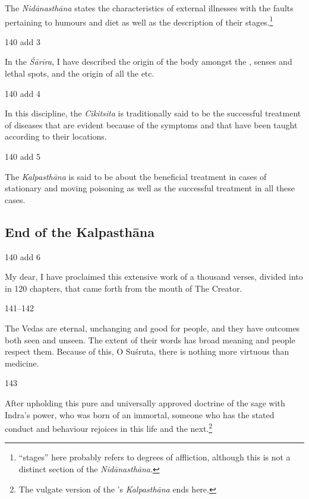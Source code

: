 \begin{translation}
The \emph{Nidānasthāna} states the characteristics of external
illnesses with the faults pertaining to humours and diet as well as
the description of their stages.\footnote{ “stages” here
    probably refers to degrees of affliction, although this is not a
    distinct section of the \emph{Nidānasthāna}.} 
    

\item[140 add 3]

In the \emph{Śārīra}, I have described the origin of the body amongst the 
, senses and lethal spots, and the origin of all the 
 etc. 

\item[140 add 4]

In this discipline, the \emph{Cikitsita} is traditionally said to be the successful 
treatment of diseases that are evident because of the symptoms and that have 
been taught according to their locations.

\item[140 add 5]

The \emph{Kalpasthāna} is said to be about the beneficial treatment in cases of 
stationary and moving poisoning as well as the successful treatment in all these 
cases.


\subsection{End of the Kalpasthāna}

\item[140 add 6]

My dear, I have proclaimed this extensive work of a thousand verses, divided 
into in 120 chapters, that came forth from the mouth of The Creator.

\item[141--142]

The Vedas are eternal, unchanging and good for people, and they have 
outcomes both seen and unseen. The extent of their words has broad meaning 
and people respect them.  Because of this, O Suśruta, there is nothing more 
virtuous than medicine.

\item[143]

After upholding this pure and universally approved doctrine of the
sage with Indra's power, who was born of an immortal, someone who has
the stated conduct and behaviour rejoices in this life and the
next.\footnote{The vulgate version of the \SS's \emph{Kalpasthāna}
    ends here.}


\end{translation}
